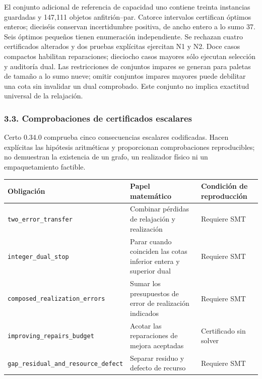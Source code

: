 \documentclass[spanish,11pt,a4paper]{article}
\newcounter{none}
\begin{document}
El conjunto adicional de referencia de capacidad uno contiene treinta
instancias guardadas y 147,111 objetos anfitrión--par. Catorce
intervalos certifican óptimos enteros; dieciséis conservan incertidumbre
positiva, de ancho entero a lo sumo 37. Seis óptimos pequeños tienen
enumeración independiente. Se rechazan cuatro certificados alterados y
dos pruebas explícitas ejercitan N1 y N2. Doce casos compactos habilitan
reparaciones; dieciocho casos mayores sólo ejecutan selección y
auditoría dual. Las restricciones de conjuntos impares se generan para
paletas de tamaño a lo sumo nueve; omitir conjuntos impares mayores
puede debilitar una cota sin invalidar un dual comprobado. Este conjunto
no implica exactitud universal de la relajación.

\subsubsection{3.3. Comprobaciones de certificados
escalares}\label{comprobaciones-de-certificados-escalares}

Certo 0.34.0 comprueba cinco consecuencias escalares codificadas. Hacen
explícitas las hipótesis aritméticas y proporcionan comprobaciones
reproducibles; no demuestran la existencia de un grafo, un realizador
físico ni un empaquetamiento factible.

{\def\LTcaptype{none} %
\begin{longtable}[]{@{}
  >{\raggedright\arraybackslash}p{}
  >{\raggedright\arraybackslash}p{}
  >{\raggedright\arraybackslash}p{}@{}}
\toprule\noalign{}
\begin{minipage}[b]{\linewidth}\raggedright
Obligación
\end{minipage} & \begin{minipage}[b]{\linewidth}\raggedright
Papel matemático
\end{minipage} & \begin{minipage}[b]{\linewidth}\raggedright
Condición de reproducción
\end{minipage} \\
\midrule\noalign{}
\endhead
\bottomrule\noalign{}
\endlastfoot
\nolinkurl{two_error_transfer} & Combinar pérdidas de relajación y
realización & Requiere SMT \\
\nolinkurl{integer_dual_stop} & Parar cuando coinciden las cotas inferior
entera y superior dual & Requiere SMT \\
\nolinkurl{composed_realization_errors} & Sumar los presupuestos de error
de realización indicados & Requiere SMT \\
\nolinkurl{improving_repairs_budget} & Acotar las reparaciones de mejora
aceptadas & Certificado sin solver \\
\nolinkurl{gap_residual_and_resource_defect} & Separar residuo y
defecto de recurso & Requiere SMT \\
\end{longtable}
}
\end{document}
